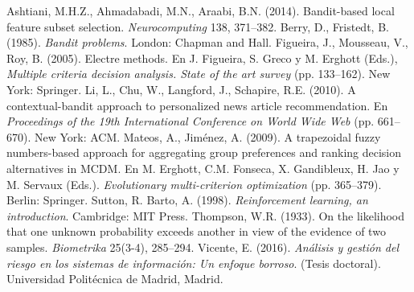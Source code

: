 \documentclass[spanish,12pt,twoside]{book}
\begin{document}
\frontmatter




\tableofcontents %

\listoffigures
\listoftables
\listofalgorithms %

\mainmatter







\appendix


\backmatter

\begin{thebibliography}{00}
	  Ashtiani, M.H.Z., Ahmadabadi, M.N., Araabi, B.N. (2014). Bandit-based local feature subset selection. \emph{Neurocomputing} 138, 371--382.
	 Berry, D., Fristedt, B. (1985). \emph{Bandit problems}. London: Chapman and Hall.
	 Figueira, J., Mousseau, V., Roy, B. (2005). Electre methods. En J. Figueira, S. Greco y M. Erghott (Eds.), \emph{Multiple criteria decision analysis. State of the art survey} (pp. 133--162). New York: Springer.
	 Li, L., Chu, W., Langford, J., Schapire, R.E. (2010). A contextual-bandit approach to personalized news article recommendation. En \emph{Proceedings of the 19th International Conference on World Wide Web} (pp. 661--670). New York: ACM.
	 Mateos, A., Jiménez, A. (2009). A trapezoidal fuzzy numbers-based approach for aggregating group preferences and ranking decision alternatives in MCDM. En M. Erghott, C.M. Fonseca, X. Gandibleux, H. Jao y M. Servaux (Eds.). \emph{Evolutionary multi-criterion optimization} (pp. 365--379). Berlin: Springer.
	 Sutton, R. Barto, A. (1998). \emph{Reinforcement learning, an introduction}. Cambridge: MIT Press.
	 Thompson, W.R. (1933). On the likelihood that one unknown probability exceeds another in view of the evidence of two samples. \emph{Biometrika} 25(3-4), 285--294.
	 Vicente, E. (2016). \emph{Análisis y gestión del riesgo en los sistemas de información: Un enfoque borroso}. (Tesis doctoral). Universidad Politécnica de Madrid, Madrid.
\end{thebibliography}
\end{document}
